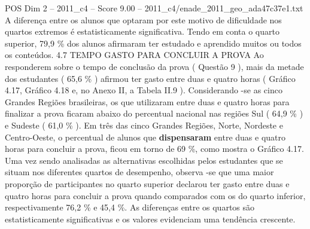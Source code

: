 \begin{textsample}{POS Dim 2 – 2011\_c4 – Score 9.00 – 2011\_c4/enade\_2011\_geo\_ada47c37e1.txt}
A diferença entre os alunos que optaram por este motivo de dificuldade nos quartos extremos é estatisticamente significativa.
Tendo em conta o quarto superior, 79,9 \% dos alunos afirmaram ter estudado e aprendido muitos ou todos os conteúdos. 4.7 TEMPO GASTO PARA CONCLUIR A PROVA Ao responderem sobre o tempo de conclusão da prova ( Questão 9 ), mais da metade dos estudantes ( 65,6 \% ) afirmou ter gasto entre duas e quatro horas ( Gráfico 4.17, Gráfico 4.18 e, no Anexo II, a Tabela II.9 ).
Considerando -se as cinco Grandes Regiões brasileiras, os que utilizaram entre duas e quatro horas para finalizar a prova ficaram abaixo do percentual nacional nas regiões Sul ( 64,9 \% ) e Sudeste ( 61,0 \% ).
Em três das cinco Grandes Regiões, Norte, Nordeste e Centro-Oeste, o percentual de alunos que \textbf{dispensaram} entre duas e quatro horas para concluir a prova, ficou em torno de 69 \%, como mostra o Gráfico 4.17.
Uma vez sendo analisadas as alternativas escolhidas pelos estudantes que se situam nos diferentes quartos de desempenho, observa -se que uma maior proporção de participantes no quarto superior declarou ter gasto entre duas e quatro horas para concluir a prova quando comparados com os do quarto inferior, respectivamente 76,2 \% e 45,4 \%.
As diferenças entre os quartos são estatisticamente significativas e os valores evidenciam uma tendência crescente.

\end{textsample}

